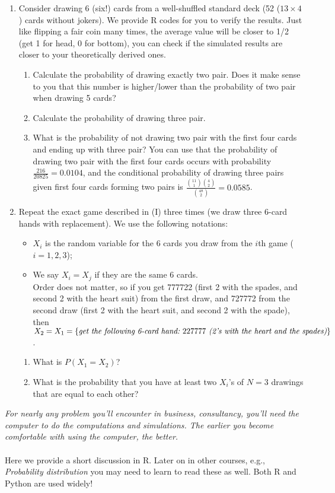 \begin{exercise}
	\begin{enumerate}
		\item Consider drawing 6 (six!) cards from a well-shuffled standard deck (52 ($13\times 4$) cards without jokers). We provide  {R} codes for you to verify the results. Just like flipping a fair coin many times, the average value will be closer to 1/2 (get 1 for head, 0 for bottom), you can check if the simulated results are closer to your theoretically derived ones.
		\begin{enumerate}
			\item Calculate the probability of drawing exactly two pair. Does it make sense to you that this number is higher/lower than the probability of two pair when drawing 5 cards?
			\item Calculate the probability of drawing three pair.
			\item What is the probability of not drawing two pair with the first four cards and ending up with three pair? You can use that the probability of drawing two pair with the first four cards occurs with probability $\frac{216}{20825}=0.0104$, and the conditional probability of drawing three pairs given first four cards forming two pairs is $\frac{{11\choose 1}{4 \choose 2} }{{48 \choose 2}}=0.0585$.
		\end{enumerate}
	\item Repeat the exact game described in (I) three times (we draw three 6-card hands with replacement). We use the following notations:
	\begin{itemize}
		\item $X_i$ is the random variable for the 6 cards you draw from the $i$th game ($i=1,2,3$);
		\item We say $X_i=X_j$ if they are the same 6 cards.\\ {\scriptsize Order does not matter, so if you get 777722 (first 2 with the spades, and second 2 with the heart suit) from the first draw, and 727772 from the second draw (first 2 with the heart suit, and second 2 with the spade),
			then $X_2=X_1=\{\textit{get the following 6-card~} \\ \textit{hand:~} 227777 \textit{~(2's with the heart and the spades)}\}$}.\\
	\end{itemize}
\begin{enumerate}
	\item What is ${P}(X_1=X_2)$? 
	\item What is the probability that you have at least two $X_i$'s of $N=3$ drawings that are equal to each other? 
\end{enumerate}
	\end{enumerate}
\textit{For nearly any problem you'll encounter in business, consultancy, you'll need the computer to do the computations and simulations. The earlier you become comfortable with using the computer, the better.} \\~\\
Here we provide a short discussion in R. Later on in other courses, e.g., \textit{Probability distribution} you may need to learn to read these as well. Both R and Python are used widely!


\end{exercise}
